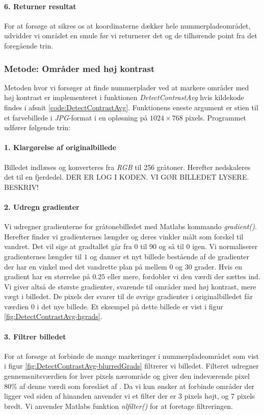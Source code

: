 \paragraph{6. Returner resultat}
For at forsøge at sikres os at koordinaterne dækker hele nummerpladeområdet, udvidder vi området en smule før vi returnerer det og de tilhørende point fra det foregående trin. 


\subsubsection{Metode: Områder med høj kontrast}
Metoden hvor vi forsøger at finde nummerplader ved at markere områder med høj kontrast er implementeret i funktionen \textit{DetectContrastAvg} hvis kildekode findes i afsnit \vref{code:DetectContrastAvg}. Funktionens eneste argument er stien til et farvebillede i \textit{JPG}-format i en opløsning på $1024 \times 768$ pixels. Programmet udfører følgende trin:

\paragraph{1. Klargørelse af originalbillede}
Billedet indlæses og konverteres fra \textit{RGB} til 256 gråtoner. Herefter nedskaleres det til en fjerdedel. DER ER LOG I KODEN. VI GØR BILLEDET LYSERE. BESKRIV!

\paragraph{2. Udregn gradienter}
Vi udregner gradienterne for gråtonebilledet med Matlabs kommando \textit{gradient()}. Herefter finder vi gradienternes længder og deres vinkler målt som forskel til vandret. Det vil sige at gradtallet går fra 0 til 90 og så til 0 igen. Vi normaliserer gradienternes længder til $1$ og danner et nyt billede bestående af de gradienter der har en vinkel med det vandrette plan på mellem $0$ og $30$ grader. Hvis en gradient har en størrelse på $0.25$ eller mere, fordobler vi den værdi der sættes ind. Vi giver altså de største gradienter, svarende til områder med høj kontrast, mere vægt i billedet. De pixels der svarer til de øvrige gradienter i originalbilledet får værdien $0$ i det nye billede. Et eksempel på dette billede er vist i figur \vref{fig:DetectContrastAvg-hgrads}.

\paragraph{3. Filtrer billedet}
For at forsøge at forbinde de mange markeringer i nummerpladeområdet som vist i figur \vref{fig:DetectContrastAvg-blurredGrads} filtrerer vi billedet. Filteret udregner gennemsnitsværdien for hver pixels nærområde og giver den indeværende pixel 80\% af denne værdi som foreslået af \cite{shapiro}. Da vi kun ønsker at forbinde områder der ligger ved siden af hinanden anvender vi et filter der er 3 pixels højt, og 7 pixels bredt. Vi anvender Matlabs funktion \textit{nlfilter()} for at foretage filtreringen.

